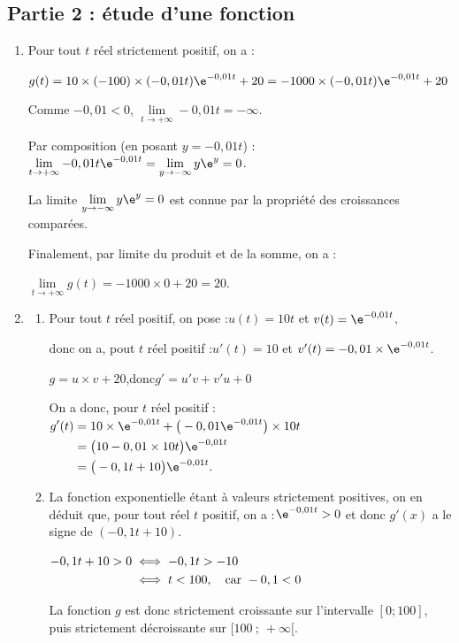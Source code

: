 \subsection*{Partie 2 : étude d'une fonction}

\begin{enumerate}
	\item Pour tout $t$ réel strictement positif, on a :

$g(t) = 10 \times (-100) \times (-0,01t)\e^{-0,01t} + 20=-1000 \times (-0,01t)\e^{-0,01t} + 20$

Comme $-0,01 < 0$, \quad$\lim\limits_{t \to +\infty} -0,01t = -\infty$.

Par composition (en posant $y = -0,01t$) :\quad $\lim\limits_{t \to +\infty} -0,01t \e^{-0,01t} = \lim\limits_{y \to -\infty} y\e^{y} = 0$.

La limite $\lim\limits_{y \to -\infty} y\e^{y} = 0$ est connue par la propriété des croissances comparées.

Finalement, par limite du produit et de la somme, on a :

$\lim\limits_{t \to +\infty} g(t) = -1000 \times 0 + 20 = 20$.

	\item \begin{enumerate}
		\item Pour tout $t$ réel positif, on pose :\quad $u(t) = 10t$ \quad et \quad $v(t) = \e^{-0,01t}$,

donc on a, pout $t$ réel positif :\quad $u'(t) = 10$ \quad et \quad $v'(t) = -0,01 \times \e^{-0,01t}$.

$g = u\times v + 20$,\quad donc\quad $g' = u'v+v'u + 0$

On a donc, pour $t$ réel positif : \quad $  \aligned[t] g'(t) &= 10 \times \e^{-0,01t} + \big(-0,01\e^{-0,01t}\big)\times 10t\\
		&= \big(10 - 0,01\times 10t\big)\e^{-0,01t}\\
		&= \big(-0,1 t + 10\big) \e^{-0,01 t}.\endaligned$

		\item La fonction exponentielle étant à valeurs strictement positives, on en déduit que, pour tout réel $t$ positif, on a :\quad $\e^{-0,01t} >0$ \quad et donc $g'(x)$ a le signe de \quad $(-0,1t+ 10)$.

$\aligned[t] -0,1t + 10 > 0 &\iff -0,1t > -10\\
&\iff t < 100,\quad \text{car }  -0,1 < 0\endaligned$

La fonction $g$ est donc strictement croissante sur l'intervalle $[0 ; 100]$, puis strictement décroissante sur $[100~;~+\infty[$.


\end{enumerate}
\end{enumerate}

